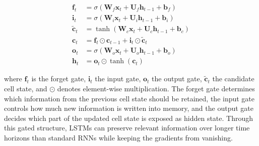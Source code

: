 \begin{align}
  \mathbf{f}_t &= \sigma\left(\mathbf{W}_f \mathbf{x}_t + \mathbf{U}_f \mathbf{h}_{t-1} + \mathbf{b}_f\right) \\
  \mathbf{i}_t &= \sigma\left(\mathbf{W}_i \mathbf{x}_t + \mathbf{U}_i \mathbf{h}_{t-1} + \mathbf{b}_i\right) \\
  \tilde{\mathbf{c}}_t &= \tanh\left(\mathbf{W}_c \mathbf{x}_t + \mathbf{U}_c \mathbf{h}_{t-1} + \mathbf{b}_c\right) \\
  \mathbf{c}_t &= \mathbf{f}_t \odot \mathbf{c}_{t-1} + \mathbf{i}_t \odot \tilde{\mathbf{c}}_t \\
  \mathbf{o}_t &= \sigma\left(\mathbf{W}_o \mathbf{x}_t + \mathbf{U}_o \mathbf{h}_{t-1} + \mathbf{b}_o\right) \\
  \mathbf{h}_t &= \mathbf{o}_t \odot \tanh\left(\mathbf{c}_t\right)
  \label{eq:lstm}
\end{align}

where $\mathbf{f}_t$ is the forget gate, $\mathbf{i}_t$ the input gate, $\mathbf{o}_t$ the output gate, $\tilde{\mathbf{c}}_t$ the candidate cell state, and $\odot$ denotes element-wise multiplication. The forget gate determines which information from the previous cell state should be retained, the input gate controls how much new information is written into memory, and the output gate decides which part of the updated cell state is exposed as hidden state. Through this gated structure, LSTMs can preserve relevant information over longer time horizons than standard RNNs while keeping the gradients from vanishing.

